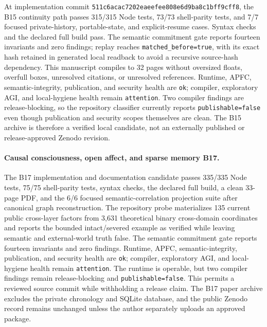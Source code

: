 \documentclass[10pt,twocolumn]{article}
\theoremstyle{definition}
\theoremstyle{plain}
\theoremstyle{remark}
\newcommand{\file}[1]{\nolinkurl{#1}}
\newcommand{\openperceptionrevision}{\textsf{B17}}
\begin{document}
At implementation commit \file{511c6acac7202eaeefee808e6d9ba8c1bff9cff8}, the B15 continuity path passes 315/315 Node tests, 73/73 shell-parity tests, and 7/7 focused private-history, portable-state, and explicit-resume cases.  Syntax checks and the declared full build pass.  The semantic commitment gate reports fourteen invariants and zero findings; replay reaches \file{matched\_before=true}, with its exact hash retained in generated local readback to avoid a recursive source-hash dependency.  This manuscript compiles to 32 pages without oversized floats, overfull boxes, unresolved citations, or unresolved references.  Runtime, APFC, semantic-integrity, publication, and security health are \file{ok}; compiler, exploratory AGI, and local-hygiene health remain \file{attention}.  Two compiler findings are release-blocking, so the repository classifier currently reports \file{publishable=false} even though publication and security scopes themselves are clean.  The B15 archive is therefore a verified local candidate, not an externally published or release-approved Zenodo revision.

\paragraph{Causal consciousness, open affect, and sparse memory \openperceptionrevision.}
The B17 implementation and documentation candidate passes 335/335 Node tests, 75/75 shell-parity tests, syntax checks, the declared full build, a clean 33-page PDF, and the 6/6 focused semantic-correlation projection suite after canonical graph reconstruction.  The repository probe materializes 135 current public cross-layer factors from 3,631 theoretical binary cross-domain coordinates and reports the bounded intact/severed example as verified while leaving semantic and external-world truth false.  The semantic commitment gate reports fourteen invariants and zero findings.  Runtime, APFC, semantic-integrity, publication, and security health are \file{ok}; compiler, exploratory AGI, and local-hygiene health remain \file{attention}.  The runtime is operable, but two compiler findings remain release-blocking and \file{publishable=false}.  This permits a reviewed source commit while withholding a release claim.  The B17 paper archive excludes the private chronology and SQLite database, and the public Zenodo record remains unchanged unless the author separately uploads an approved package.
\end{document}
